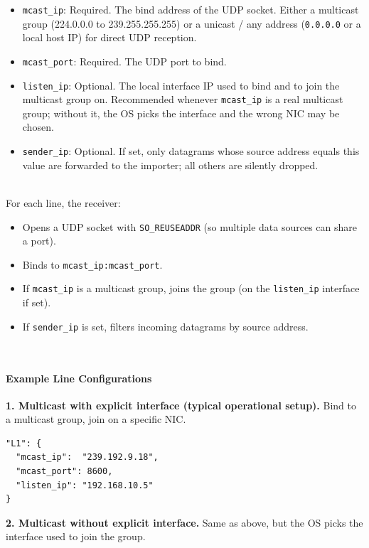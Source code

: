 \begin{itemize}
  \item \texttt{mcast\_ip}: Required. The bind address of the UDP socket. Either a multicast group (224.0.0.0 to 239.255.255.255) or a unicast / any address (\texttt{0.0.0.0} or a local host IP) for direct UDP reception.
  \item \texttt{mcast\_port}: Required. The UDP port to bind.
  \item \texttt{listen\_ip}: Optional. The local interface IP used to bind and to join the multicast group on. Recommended whenever \texttt{mcast\_ip} is a real multicast group; without it, the OS picks the interface and the wrong NIC may be chosen.
  \item \texttt{sender\_ip}: Optional. If set, only datagrams whose source address equals this value are forwarded to the importer; all others are silently dropped.
\end{itemize}
\ \\

For each line, the receiver:
\begin{itemize}
  \item Opens a UDP socket with \texttt{SO\_REUSEADDR} (so multiple data sources can share a port).
  \item Binds to \texttt{mcast\_ip:mcast\_port}.
  \item If \texttt{mcast\_ip} is a multicast group, joins the group (on the \texttt{listen\_ip} interface if set).
  \item If \texttt{sender\_ip} is set, filters incoming datagrams by source address.
\end{itemize}
\ \\

\paragraph{Example Line Configurations}

\textbf{1. Multicast with explicit interface (typical operational setup).} Bind to a multicast group, join on a specific NIC.

\begin{lstlisting}
"L1": {
  "mcast_ip":  "239.192.9.18",
  "mcast_port": 8600,
  "listen_ip": "192.168.10.5"
}
\end{lstlisting}

\textbf{2. Multicast without explicit interface.} Same as above, but the OS picks the interface used to join the group.

